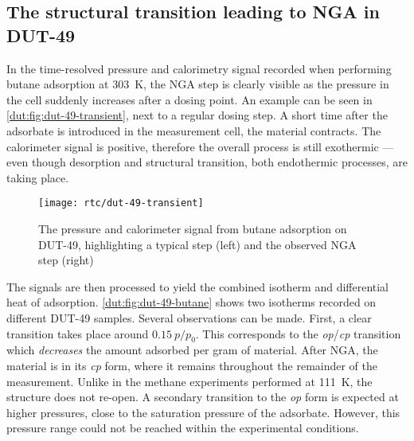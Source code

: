 
\subsection{The structural transition leading to NGA in DUT-49}

In the time-resolved pressure and calorimetry signal recorded when
performing butane adsorption at \SI{303}{\kelvin}, the NGA step 
is clearly visible as the pressure in the cell suddenly increases 
after a dosing point. An example can be seen 
in \autoref{dut:fig:dut-49-transient}, next to a regular dosing step.
A short time after the adsorbate is introduced in the measurement
cell, the material contracts. The calorimeter signal is
positive, therefore the overall process is still exothermic --- even
though desorption and structural transition, both endothermic
processes, are taking place.

\begin{figure}[htb]
    \texttt{[image: rtc/dut-49-transient]}%
    \caption{The pressure and calorimeter signal from butane adsorption
    on DUT-49, highlighting a typical step (left) and the 
    observed NGA step (right)}%
    \label{dut:fig:dut-49-transient}
\end{figure}

The signals are then processed to yield the combined isotherm and
differential heat of adsorption. \autoref{dut:fig:dut-49-butane} shows
two isotherms recorded on different DUT-49 samples. 
Several observations can be made. First, a clear transition takes place
around \(0.15~p/p_0\). This corresponds to the \textit{op}/\textit{cp} 
transition which \textit{decreases} the amount adsorbed per gram 
of material. After NGA, the material is in its \textit{cp} form,
where it remains throughout the remainder of the measurement. 
Unlike in the methane experiments performed at 
\SI{111}{\kelvin}, the structure does not re-open. A secondary 
transition to the \textit{op} form is expected at higher pressures,
close to the saturation pressure of the adsorbate. However, this 
pressure range could not be reached within the experimental conditions.

